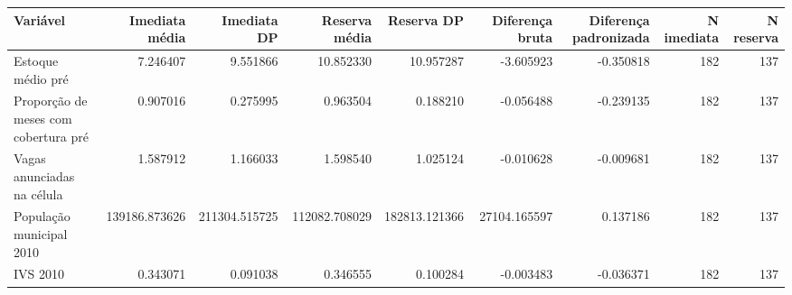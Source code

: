 \begin{tabular}{lrrrrrrrr}
\toprule
Variável & Imediata média & Imediata DP & Reserva média & Reserva DP & Diferença bruta & Diferença padronizada & N imediata & N reserva \\
\midrule
Estoque médio pré & 7.246407 & 9.551866 & 10.852330 & 10.957287 & -3.605923 & -0.350818 & 182 & 137 \\
Proporção de meses com cobertura pré & 0.907016 & 0.275995 & 0.963504 & 0.188210 & -0.056488 & -0.239135 & 182 & 137 \\
Vagas anunciadas na célula & 1.587912 & 1.166033 & 1.598540 & 1.025124 & -0.010628 & -0.009681 & 182 & 137 \\
População municipal 2010 & 139186.873626 & 211304.515725 & 112082.708029 & 182813.121366 & 27104.165597 & 0.137186 & 182 & 137 \\
IVS 2010 & 0.343071 & 0.091038 & 0.346555 & 0.100284 & -0.003483 & -0.036371 & 182 & 137 \\
\bottomrule
\end{tabular}
